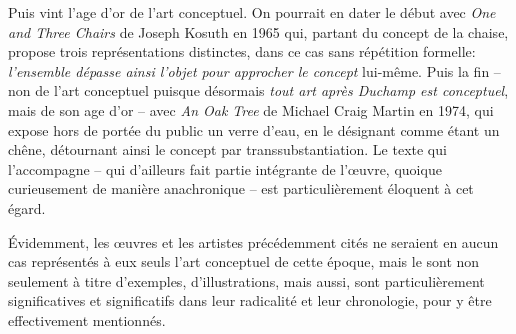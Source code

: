 \documentclass{article}
\begin{document}
Puis vint l'age d'or de l'art conceptuel. On pourrait en dater le début avec \textit{One and Three Chairs} de Joseph Kosuth en 1965 qui, partant du concept de la chaise, propose trois représentations distinctes, dans ce cas sans répétition formelle: \textit{l’ensemble dépasse ainsi l’objet pour approcher le concept} lui-même. 
Puis la fin -- non de l'art conceptuel puisque désormais \textit{tout art après Duchamp est conceptuel}, mais de son age d'or -- avec \textit{An Oak Tree} de Michael Craig Martin en 1974, qui expose hors de portée du public un verre d'eau, en le désignant comme étant un chêne, détournant ainsi le concept par transsubstantiation. Le texte qui l'accompagne -- qui d'ailleurs fait partie intégrante de l'œuvre, quoique curieusement de manière anachronique -- est particulièrement éloquent à cet égard.  

Évidemment, les œuvres et les artistes précédemment cités ne seraient en aucun cas représentés à eux seuls l'art conceptuel de cette époque, mais le sont non seulement à titre d'exemples, d'illustrations, mais aussi, sont particulièrement significatives et significatifs dans leur radicalité et leur chronologie, pour y être effectivement mentionnés.
\end{document}

